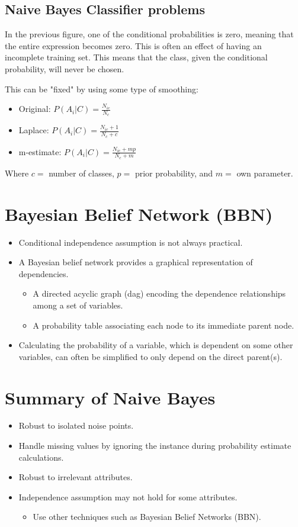 \subsection{Naive Bayes Classifier problems}
In the previous figure, one of the conditional probabilities is zero, meaning that the entire expression becomes zero.
This is often an effect of having an incomplete training set. This means that the class, given the conditional probability, will never be chosen.

This can be "fixed" by using some type of smoothing:
\begin{itemize}
    \item Original: $P(A_i|C) = \frac{N_{ic}}{N_c}$
    \item Laplace: $P(A_i|C) = \frac{N_{ic}+1}{N_c+c}$
    \item m-estimate: $P(A_i|C) = \frac{N_{ic}+mp}{N_c+m}$
\end{itemize}

Where $c =$ number of classes, $p =$ prior probability, and $m =$ own parameter.

\section{Bayesian Belief Network (BBN)}
\begin{itemize}
    \item Conditional independence assumption is not always practical.
    \item A Bayesian belief network provides a graphical representation of dependencies.
    \begin{itemize}
        \item A directed acyclic graph (dag) encoding the dependence relationships among a set of variables.
        \item A probability table associating each node to its immediate parent node.
    \end{itemize}
    \item Calculating the probability of a variable, which is dependent on some other variables, can often be simplified to only depend on the direct parent(s).
\end{itemize}

\section{Summary of Naive Bayes}
\begin{itemize}
    \item Robust to isolated noise points.
    \item Handle missing values by ignoring the instance during probability estimate calculations.
    \item Robust to irrelevant attributes.
    \item Independence assumption may not hold for some attributes.
    \begin{itemize}
        \item Use other techniques such as Bayesian Belief Networks (BBN).
    \end{itemize}
\end{itemize}
